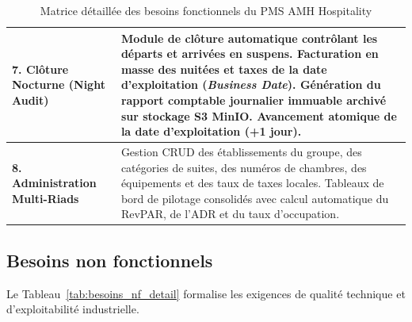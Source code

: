 \documentclass[12pt,a4paper,oneside]{report}
\begin{document}
\begin{table}[H]
\begin{tabularx}{\textwidth}{|p{3.8cm}|X|}
\hline
\textbf{7. Clôture Nocturne (Night Audit)} & Module de clôture automatique contrôlant les départs et arrivées en suspens. Facturation en masse des nuitées et taxes de la date d'exploitation (\textit{Business Date}). Génération du rapport comptable journalier immuable archivé sur stockage S3 MinIO. Avancement atomique de la date d'exploitation (+1 jour). \\
\hline
\textbf{8. Administration Multi-Riads} & Gestion CRUD des établissements du groupe, des catégories de suites, des numéros de chambres, des équipements et des taux de taxes locales. Tableaux de bord de pilotage consolidés avec calcul automatique du RevPAR, de l'ADR et du taux d'occupation. \\
\hline
\end{tabularx}
\caption{Matrice détaillée des besoins fonctionnels du PMS AMH Hospitality}
\label{tab:besoins_f_detail}
\end{table}

\subsection{Besoins non fonctionnels}

Le Tableau~\ref{tab:besoins_nf_detail} formalise les exigences de qualité technique et d'exploitabilité industrielle.
\end{document}
